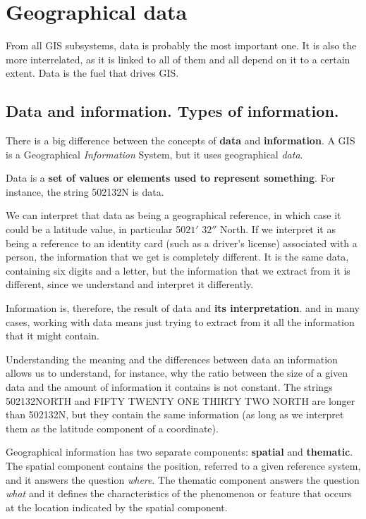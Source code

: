 

\chapter{Geographical data}

\pagestyle{fancy}

From all GIS subsystems, data is probably the most important one. It is also the more interrelated, as it is linked to all of them and all depend on it to a certain extent. Data is the fuel that drives GIS. 

\section{Data and information. Types of information.}

There is a big difference between the concepts of \textbf{data} and \textbf{information}. A GIS is a Geographical \emph{Information} System, but it uses geographical \emph{data}.

Data is a \textbf{set of values or elements used to represent something}. For instance, the string 502132N is data.

We can interpret that data as being a geographical reference, in which case it could be a latitude value, in particular 50\degree $21'$ $32''$ North. If we interpret it as being a reference to an identity card (such as a driver's license) associated with a person, the information that we get is completely different. It is the same data, containing six digits and a letter, but the information that we extract from it is different, since we understand and interpret it differently.

Information is, therefore, the result of data and \textbf{its interpretation}. and in many cases, working with data means just trying to extract from it all the information that it might contain.

Understanding the meaning and the differences between data an information allows us to understand, for instance, why the ratio between the size of a given data and the amount of information it contains is not constant. The strings 502132NORTH and FIFTY TWENTY ONE THIRTY TWO NORTH are longer than 502132N, but they contain the same information (as long as we interpret them as the latitude component of a coordinate).

Geographical information has two separate components: \textbf{spatial} and \textbf{thematic}. The spatial component contains the position, referred to a given reference system, and it answers the question \emph{where}. The thematic component answers the question \emph{what} and it defines the characteristics of the phenomenon or feature that occurs at the location indicated by the spatial component.

